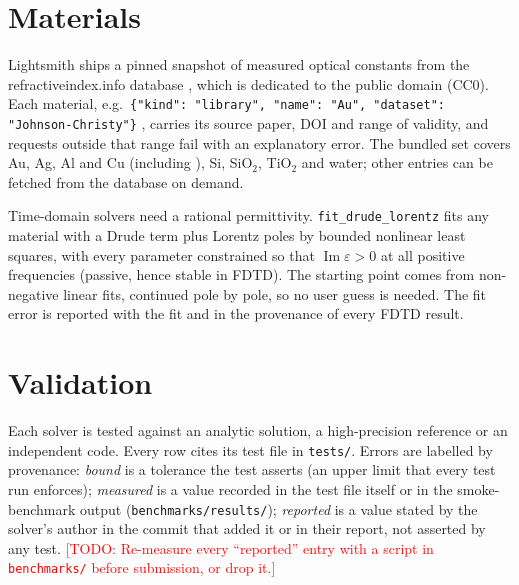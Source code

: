 \documentclass[11pt]{article}
\newcommand{\todo}[1]{\textcolor{red}{[TODO: #1]}}
\newcommand{\code}[1]{\texttt{#1}}
\newcommand{\LS}{Lightsmith}
\begin{document}
\section{Materials}
\label{sec:materials}
\LS{} ships a pinned snapshot of measured optical constants from the refractiveindex.info database
\cite{Polyanskiy2024,refractiveindexinfo}, which is dedicated to the public domain (CC0). Each
material, e.g.\ \code{\{"kind": "library", "name": "Au", "dataset": "Johnson-Christy"\}}
\cite{JohnsonChristy1972}, carries its source paper, DOI and range of validity, and requests outside
that range fail with an explanatory error. The bundled set covers Au, Ag, Al and Cu (including
\cite{JohnsonChristy1972,Rakic1998,McPeak2015}), Si, SiO$_2$, TiO$_2$ and water; other entries can be
fetched from the database on demand.

Time-domain solvers need a rational permittivity. \code{fit\_drude\_lorentz} fits any material with a
Drude term plus Lorentz poles by bounded nonlinear least squares, with every parameter constrained so
that $\operatorname{Im}\varepsilon>0$ at all positive frequencies (passive, hence stable in FDTD). The
starting point comes from non-negative linear fits, continued pole by pole, so no user guess is
needed. The fit error is reported with the fit and in the provenance of every FDTD result.

\section{Validation}
\label{sec:validation}
Each solver is tested against an analytic solution, a high-precision reference or an independent
code. Every row cites its test file in \code{tests/}. Errors are labelled by provenance: \emph{bound}
is a tolerance the test asserts (an upper limit that every test run enforces); \emph{measured} is a
value recorded in the test file itself or in the smoke-benchmark output (\code{benchmarks/results/});
\emph{reported} is a value stated by the solver's author in the commit that added it or in their
report, not asserted by any test. \todo{Re-measure every ``reported'' entry with a script
in \code{benchmarks/} before submission, or drop it.}
\end{document}
